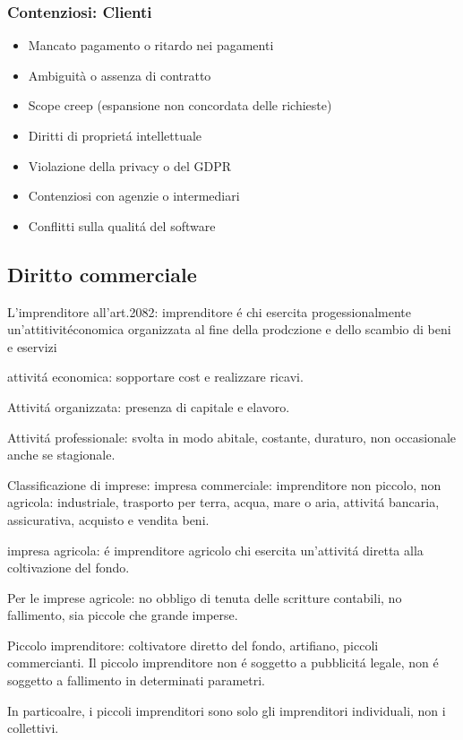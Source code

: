 \documentclass{article}
\begin{document}
\subsubsection{Contenziosi: Clienti}
\begin{itemize}
    \item Mancato pagamento o ritardo nei pagamenti
    \item Ambiguità o assenza di contratto
    \item Scope creep (espansione non concordata delle richieste)
    \item Diritti di propriet\'a intellettuale
    \item Violazione della privacy o del GDPR
    \item Contenziosi con agenzie o intermediari
    \item Conflitti sulla qualit\'a del software
\end{itemize}

\subsection{Diritto commerciale}

L'imprenditore all'art.2082: imprenditore \'e chi esercita progessionalmente un'attitivit\' economica organizzata al fine della prodczione e dello scambio di beni e eservizi

attivit\'a economica: sopportare cost e realizzare ricavi.

Attivit\'a organizzata: presenza di capitale e elavoro.

Attivit\'a professionale: svolta in modo abitale, costante, duraturo, non occasionale anche se stagionale.

Classificazione di imprese:
impresa commerciale: imprenditore non piccolo, non agricola: industriale, trasporto per terra, acqua, mare o aria, attivit\'a bancaria, assicurativa, acquisto e vendita beni.

impresa agricola: \'e imprenditore agricolo chi esercita un'attivit\'a diretta alla coltivazione del fondo.

Per le imprese agricole: no obbligo di tenuta delle scritture contabili, no fallimento, sia piccole che grande imperse.

Piccolo imprenditore: coltivatore diretto del fondo, artifiano, piccoli commercianti. Il piccolo imprenditore non \'e soggetto a pubblicit\'a legale,
non \'e soggetto a fallimento in determinati parametri.

In particoalre, i piccoli imprenditori sono solo gli imprenditori individuali, non i collettivi.
\end{document}
